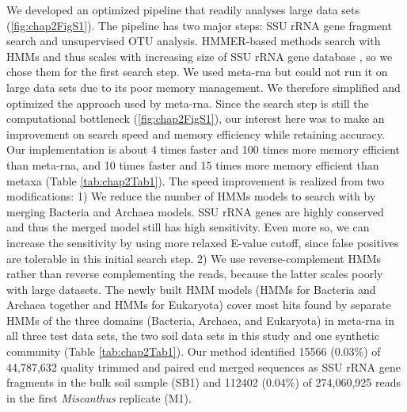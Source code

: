 \documentclass[]{msu-thesis}
\begin{document}
We developed an optimized pipeline that readily analyses large data sets (\cref{fig:chap2FigS1}). The pipeline has two major steps: SSU rRNA gene fragment search and unsupervised OTU analysis. HMMER-based methods search with HMMs and thus scales with increasing size of SSU rRNA gene database \cite{cole_ribosomal_2014}, so we chose them for the first search step. We used meta-rna \cite{huang_identification_2009} but could not run it on large data sets due to its poor memory management. We therefore simplified and optimized the approach used by meta-rna. Since the search step is still the computational bottleneck (\cref{fig:chap2FigS1}), our interest here was to make an improvement on search speed and memory efficiency while retaining accuracy. Our implementation is about 4 times faster and 100 times more memory efficient than meta-rna, and 10 times faster and 15 times more memory efficient than metaxa \cite{bengtsson_metaxa:_2011} (Table \ref{tab:chap2Tab1}). The speed improvement is realized from two modifications: 1) We reduce the number of HMMs models to search with by merging Bacteria and Archaea models. SSU rRNA genes are highly conserved and thus the merged model still has high sensitivity. Even more so, we can increase the sensitivity by using more relaxed E-value cutoff, since false positives are tolerable in this initial search step. 2) We use reverse-complement HMMs rather than reverse complementing the reads, because the latter scales poorly with large datasets. The newly built HMM models (HMMs for Bacteria and Archaea together and HMMs for Eukaryota) cover most hits found by separate HMMs of the three domains (Bacteria, Archaea, and Eukaryota) in meta-rna in all three test data sets, the two soil data sets in this study and one synthetic community (Table \ref{tab:chap2Tab1}). Our method identified 15566 (0.03\%) of 44,787,632 quality trimmed and paired end merged sequences as SSU rRNA gene fragments in the bulk soil sample (SB1) and 112402 (0.04\%) of 274,060,925 reads in the first \textit{Miscanthus} replicate (M1).
\end{document}

